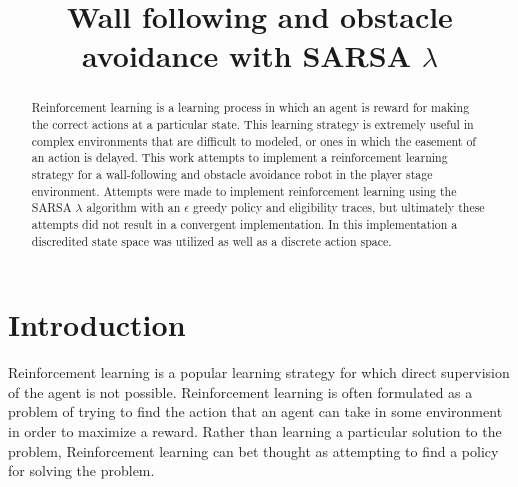 \documentclass[conference]{IEEEtran}
\begin{document}
%
\title{Wall following and obstacle avoidance with SARSA $\lambda$}


\author{
}



\maketitle


\begin{abstract}
\boldmath
Reinforcement learning is a learning process in which an agent is reward for making the correct actions at a particular state. 
This learning strategy is extremely useful in complex environments that are difficult to modeled, or ones in which the easement of an action is delayed.
This work attempts to implement a reinforcement learning strategy for a wall-following and obstacle avoidance robot in the player stage environment.
Attempts were made to implement reinforcement learning using the SARSA $\lambda$ algorithm with an $\epsilon$ greedy policy and eligibility traces, but ultimately these attempts did not result in a convergent implementation.
In this implementation a discredited state space was utilized as well as a discrete action space.
\end{abstract}
\IEEEpeerreviewmaketitle



\section{Introduction}

Reinforcement learning is a popular learning strategy for which direct supervision of the agent is not possible\cite{poliscuk_adaptive_2002,szepesvari_algorithms_2010}. 
Reinforcement learning is often formulated as a problem of trying to find the action that an agent can take in some environment in order to maximize a reward.
Rather than learning a particular solution to the problem, Reinforcement learning can bet thought as attempting to find a policy for solving the problem.  
\end{document}
